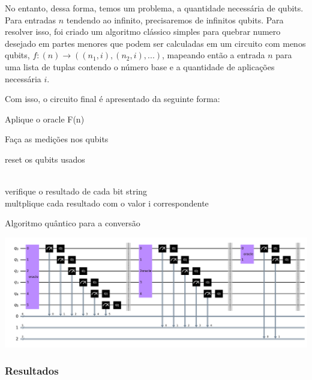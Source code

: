 \documentclass{article}
\begin{document}
No entanto, dessa forma, temos um problema, a quantidade necessária de qubits. Para entradas $n$ tendendo ao infinito, precisaremos de infinitos qubits. Para resolver isso, foi criado um algoritmo clássico simples para quebrar numero desejado em partes menores que podem ser calculadas em um circuito com menos qubits, $ f: (n) \to ((n_1, i), (n_2, i), ...)$, mapeando então a entrada $n$ para uma lista de tuplas contendo o número base e a quantidade de aplicações necessária $i$.

Com isso, o circuito final é apresentado da seguinte forma:

\begin{algorithm}
	\begin{algorithmic}
		
			Aplique o oracle F(n)
			
			Faça as medições nos qubits
			
			reset os qubits usados
			
		\EndFor\\
		
		verifique o resultado de cada bit string\\
		
		multplique cada resultado com o valor i correspondente
		
	\end{algorithmic}
	\caption{Algoritmo quântico para a conversão}
	\label{alg:miles-to-km-quantum-algortihm}
\end{algorithm}

\begin{center}
	\includegraphics[scale=0.15]{number_breakdown_circuit.png}
	\label{fig:miles-km-circuit}
\end{center}

\subsubsection{Resultados}
\end{document}
